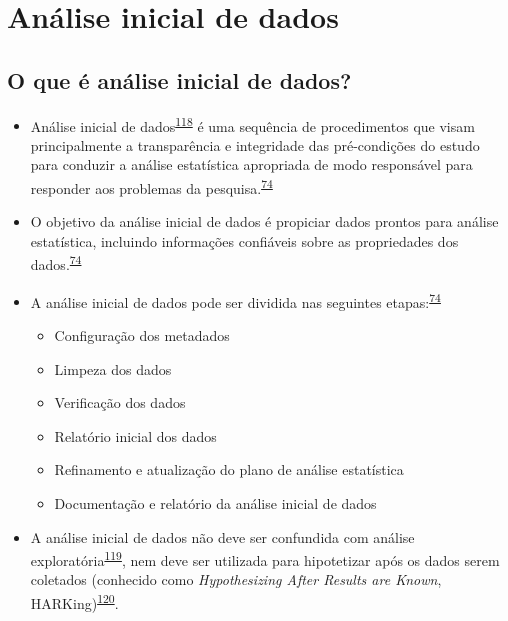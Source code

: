 \documentclass[
  a4paper,
]{book}
\begin{document}
\hypertarget{analise-inicial}{%
\section{Análise inicial de dados}\label{analise-inicial}}

\hypertarget{o-que-uxe9-anuxe1lise-inicial-de-dados}{%
\subsection{O que é análise inicial de dados?}\label{o-que-uxe9-anuxe1lise-inicial-de-dados}}

\begin{itemize}
\item
  Análise inicial de dados\textsuperscript{\protect\hyperlink{ref-chatfield1986}{118}} é uma sequência de procedimentos que visam principalmente a transparência e integridade das pré-condições do estudo para conduzir a análise estatística apropriada de modo responsável para responder aos problemas da pesquisa.\textsuperscript{\protect\hyperlink{ref-Baillie2022}{74}}
\item
  O objetivo da análise inicial de dados é propiciar dados prontos para análise estatística, incluindo informações confiáveis sobre as propriedades dos dados.\textsuperscript{\protect\hyperlink{ref-Baillie2022}{74}}
\item
  A análise inicial de dados pode ser dividida nas seguintes etapas:\textsuperscript{\protect\hyperlink{ref-Baillie2022}{74}}

  \begin{itemize}
  \item
    Configuração dos metadados
  \item
    Limpeza dos dados
  \item
    Verificação dos dados
  \item
    Relatório inicial dos dados
  \item
    Refinamento e atualização do plano de análise estatística
  \item
    Documentação e relatório da análise inicial de dados
  \end{itemize}
\item
  A análise inicial de dados não deve ser confundida com análise exploratória\textsuperscript{\protect\hyperlink{ref-Ferketich1986}{119}}, nem deve ser utilizada para hipotetizar após os dados serem coletados (conhecido como \emph{Hypothesizing After Results are Known}, HARKing)\textsuperscript{\protect\hyperlink{ref-Kerr1998}{120}}.
\end{itemize}
\end{document}

